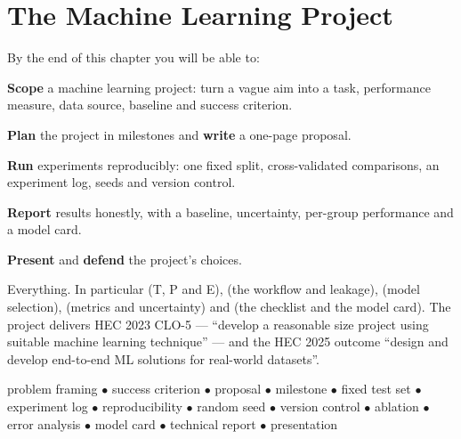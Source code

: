 \chapter{The Machine Learning Project}\label{ch:project}

\begin{outcomes}
By the end of this chapter you will be able to:
\begin{tight}
  \item \textbf{Scope} a machine learning project: turn a vague aim into a task,
        performance measure, data source, baseline and success criterion.
  \item \textbf{Plan} the project in milestones and \textbf{write} a one-page
        proposal.
  \item \textbf{Run} experiments reproducibly: one fixed split, cross-validated
        comparisons, an experiment log, seeds and version control.
  \item \textbf{Report} results honestly, with a baseline, uncertainty, per-group
        performance and a model card.
  \item \textbf{Present} and \textbf{defend} the project's choices.
\end{tight}
\end{outcomes}

\begin{prereq}
Everything. In particular  (T, P and E),  (the
workflow and leakage),  (model selection),
 (metrics and uncertainty) and  (the checklist and the
model card). The project delivers HEC 2023 CLO-5 --- ``develop a reasonable size project
using suitable machine learning technique'' --- and the HEC 2025 outcome ``design and
develop end-to-end ML solutions for real-world datasets''.
\end{prereq}

\begin{keyterms}
problem framing $\bullet$ success criterion $\bullet$ proposal $\bullet$ milestone
$\bullet$ fixed test set $\bullet$ experiment log $\bullet$ reproducibility
$\bullet$ random seed $\bullet$ version control $\bullet$ ablation $\bullet$ error
analysis $\bullet$ model card $\bullet$ technical report $\bullet$ presentation
\end{keyterms}


